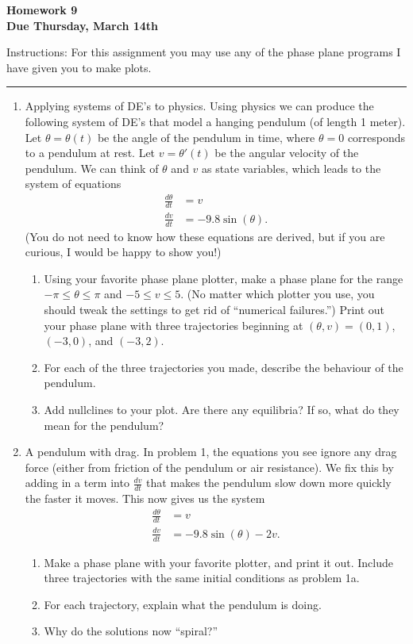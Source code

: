 \documentclass{article}
\begin{document}
\begin{center}
  \textbf{Homework 9}\\
  \textbf{Due Thursday, March 14th}
\end{center}
Instructions: For this assignment you may use any of the phase plane programs I have given you to make plots. 
\vspace{0.5cm}
\hrule
\vspace{0.5cm}
\begin{enumerate}
  \item Applying systems of DE's to physics. Using physics we can produce the following system of DE's that model a hanging pendulum (of length 1 meter). Let $\theta = \theta(t)$ be the angle of the pendulum in time, where $\theta = 0$ corresponds to a pendulum at rest. Let $v = \theta'(t)$ be the angular velocity of the pendulum. We can think of $\theta$ and $v$ as state variables, which leads to the system of equations
    \begin{align*}
      \frac{d\theta}{dt} &= v\\
      \frac{dv}{dt} &= - 9.8 \sin(\theta).
    \end{align*}
    (You do not need to know how these equations are derived, but if you are curious, I would be happy to show you!)
    \begin{enumerate}
      \item Using your favorite phase plane plotter, make a phase plane for the range $-\pi \leq \theta \leq \pi$ and $-5 \leq v \leq 5$. (No matter which plotter you use, you should tweak the settings to get rid of ``numerical failures.'') Print out your phase plane with three trajectories beginning at $(\theta, v) = (0, 1)$, $(-3, 0)$, and $(-3, 2)$. 
      \item For each of the three trajectories you made, describe the behaviour of the pendulum. 
      \item Add nullclines to your plot. Are there any equilibria? If so, what do they mean for the pendulum?
    \end{enumerate}
  \item A pendulum with drag. In problem 1, the equations you see ignore any drag force (either from friction of the pendulum or air resistance). We fix this by adding in a term into $\frac{dv}{dt}$ that makes the pendulum slow down more quickly the faster it moves. This now gives us the system
    \begin{align*}
      \frac{d\theta}{dt} &= v\\
      \frac{dv}{dt} &= -9.8 \sin(\theta) - 2v.
    \end{align*}
    \begin{enumerate}
      \item Make a phase plane with your favorite plotter, and print it out. Include three trajectories with the same initial conditions as problem 1a. 
      \item For each trajectory, explain what the pendulum is doing.
      \item Why do the solutions now ``spiral?''
    \end{enumerate}


\end{enumerate}
\end{document}
